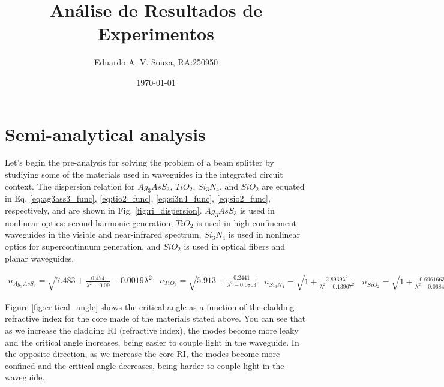 \documentclass[a4paper,12pt]{article}
\title{Análise de Resultados de Experimentos}
\author{Eduardo A. V. Souza, RA:250950}
\date{\today}
\begin{document}
\maketitle

\section{Semi-analytical analysis}
\label{sec:semi_analytical}

Let's begin the pre-analysis for solving the problem of a beam splitter by studiying some of the materials used in waveguides in the integrated circuit context. The dispersion relation for $Ag_3AsS_3$, $TiO_2$, $Si_3N_4$, and $SiO_2$ are equated in Eq. \ref{eq:ag3ass3_func}, \ref{eq:tio2_func}, \ref{eq:si3n4_func}, \ref{eq:sio2_func}, respectively, and are shown in Fig. \ref{fig:ri_dispersion}. $Ag_3AsS_3$ is used in nonlinear optics: second-harmonic generation, $TiO_2$ is used in high-confinement waveguides in the visible and near-infrared spectrum, $Si_3N_4$ is used in nonlinear optics for supercontinuum generation, and $SiO_2$ is used in optical fibers and planar waveguides.

\begin{subequations}
    \begin{align}
        n_{Ag_3AsS_3} = \sqrt{7.483 + \frac{0.474}{\lambda^2 - 0.09} - 0.0019 \lambda^2}
        \label{eq:ag3ass3_func}
    \end{align}
        
    \begin{align}
        n_{TiO_2} = \sqrt{5.913 + \frac{0.2441}{\lambda^2 - 0.0803}}
        \label{eq:tio2_func}
    \end{align}

    \begin{align}
        n_{Si_3N_4} = \sqrt{1 + \frac{2.8939 \lambda^2}{\lambda^2 - 0.13967^2}}
        \label{eq:si3n4_func}
    \end{align}

    \begin{align}
        n_{SiO_2} = \sqrt{1 + \frac{0.6961663 \lambda^2}{\lambda^2 - 0.0684043^2} + \frac{0.4079426 \lambda^2}{\lambda^2 - 0.1162414^2} + \frac{0.8974794 \lambda^2}{\lambda^2 - 9.896161}}
        \label{eq:sio2_func}
    \end{align}
\end{subequations}

Figure \ref{fig:critical_angle} shows the critical angle as a function of the cladding refractive index for the core made of the materials stated above. You can see that as we increase the cladding RI (refractive index), the modes become more leaky and the critical angle increases, being easier to couple light in the waveguide. In the opposite direction, as we increase the core RI, the modes become more confined and the critical angle decreases, being harder to couple light in the waveguide.
\end{document}
